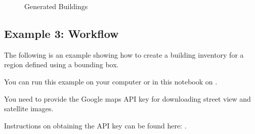 \documentclass[letterpaper,10pt,english]{sphinxmanual}
\begin{document}
\begin{figure}[htbp]
\centering
\capstart

\noindent{}
\caption{Generated Buildings}\label{\detokenize{common/user_manual/examples:num-building-city}}\end{figure}


\subsection{Example 3: Workflow}
\label{\detokenize{common/user_manual/examples:example-3-workflow}}
\sphinxAtStartPar
The following is an example showing how to create a building inventory for a region defined using a bounding box.

\sphinxAtStartPar
You can run this example on your computer or in this notebook on .

\sphinxAtStartPar
You need to provide the Google maps API key for downloading street view and satellite images.

\sphinxAtStartPar
Instructions on obtaining the API key can be found here: .
\end{document}
